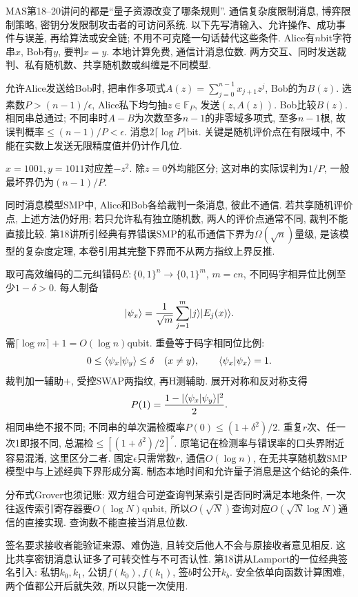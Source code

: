 MAS第18--20讲问的都是“量子资源改变了哪条规则”. 通信复杂度限制消息, 博弈限制策略, 密钥分发限制攻击者的可访问系统. 以下先写清输入、允许操作、成功事件与误差, 再给算法或安全链; 不用不可克隆一句话替代这些条件.
Alice有$n$bit字符串$x$, Bob有$y$, 要判$x=y$. 本地计算免费, 通信计消息位数. 两方交互、同时发送裁判、私有随机数、共享随机数或纠缠是不同模型.

允许Alice发送给Bob时, 把串作多项式$A(z)=\sum_{j=0}^{n-1}x_{j+1}z^j$, Bob的为$B(z)$. 选素数$P>(n-1)/\epsilon$, Alice私下均匀抽$z\in\mathbb F_P$, 发送$(z,A(z))$. Bob比较$B(z)$. 相同串总通过; 不同串时$A-B$为次数至多$n-1$的非零域多项式, 至多$n-1$根, 故误判概率$\le(n-1)/P<\epsilon$. 消息$2\lceil\log P\rceil$bit. 关键是随机评价点在有限域中, 不能在实数上发送无限精度值并仍计作几位.
\begin{example}$x=1001,y=1011$对应差$-z^2$. 除$z=0$外均能区分; 这对串的实际误判为$1/P$, 一般最坏界仍为$(n-1)/P$.\end{example}

同时消息模型SMP中, Alice和Bob各给裁判一条消息, 彼此不通信. 若共享随机评价点, 上述方法仍好用; 若只允许私有独立随机数, 两人的评价点通常不同, 裁判不能直接比较. 第18讲所引经典有界错误SMP的私币通信下界为$\Omega(\sqrt n)$量级, 是该模型的复杂度定理, 本卷引用其完整下界而不从两方指纹上界反推.

取可高效编码的二元纠错码$E:\{0,1\}^n\to\{0,1\}^m$, $m=cn$, 不同码字相异位比例至少$1-\delta>0$. 每人制备
\[\lvert \psi_x\rangle=\frac1{\sqrt m}\sum_{j=1}^m\lvert j\rangle\lvert E_j(x)\rangle.\]
需$\lceil\log m\rceil+1=O(\log n)$qubit. 重叠等于码字相同位比例:
\[0\le\langle \psi_x\vert \psi_y\rangle\le\delta\quad(x\ne y),\qquad
 \langle \psi_x\vert \psi_x\rangle=1.\]
裁判加一辅助$+$, 受控SWAP两指纹, 再H测辅助. 展开对称和反对称支得
\[P(1)=\frac{1-|\langle \psi_x\vert \psi_y\rangle|^2}{2}.\]
相同串绝不报不同; 不同串的单次漏检概率$P(0)\le(1+\delta^2)/2$. 重复$r$次、任一次1即报不同, 总漏检$\le[(1+\delta^2)/2]^r$. 原笔记在检测率与错误率的口头界附近容易混淆, 这里区分二者. 固定$\epsilon$只需常数$r$, 通信$O(\log n)$, 在无共享随机数SMP模型中与上述经典下界形成分离. 制态本地时间和允许量子消息是这个结论的条件.

分布式Grover也须记账: 双方组合可逆查询判某索引是否同时满足本地条件, 一次往返传索引寄存器要$O(\log N)$qubit, 所以$O(\sqrt N)$查询对应$O(\sqrt N\log N)$通信的直接实现. 查询数不能直接当消息位数.

签名要求接收者能验证来源、难伪造, 且转交后他人不会与原接收者意见相反. 这比共享密钥消息认证多了可转交性与不可否认性. 第18讲从Lamport的一位经典签名引入: 私钥$k_0,k_1$, 公钥$f(k_0),f(k_1)$, 签$b$时公开$k_b$. 安全依单向函数计算困难, 两个值都公开后就失效, 所以只能一次使用.


